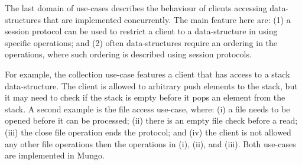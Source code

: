 
The last domain of use-cases describes the behaviour of
clients accessing data-structures that are implemented
concurrently. The main feature here are:
(1) a session protocol can be used to restrict
a client to a data-structure in using specific operations; and
(2) often data-structures require an ordering in the
operations, where such ordering is described using session protocols.

For example, the collection use-case features a client
that has access to a stack data-structure. The client
is allowed to arbitrary push elements to the stack, but
it may need to check if the stack is empty before it
pops an element from the stack.
A second example is the file access use-case, where:
(i) a file needs to be opened before it can be processed;
(ii) there is an empty file check before a read;
(iii) the close file operation ends the protocol; and
(iv) the client is not allowed any other file operations then
the operations in (i), (ii), and (iii).
Both use-cases are implemented in Mungo.

%
%
%
%
%
%
%
%
%



